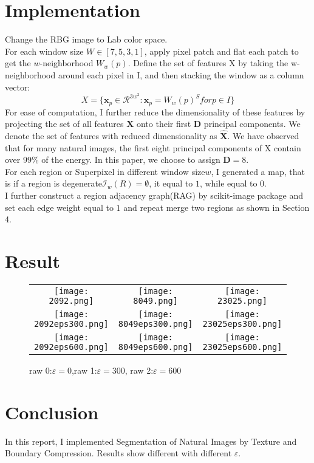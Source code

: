 \documentclass[10pt,twocolumn,letterpaper]{article}
\begin{document}
\section{Implementation}
Change the RBG image to Lab color space. \\
For each window size $W\in[7,5,3,1]$, apply pixel patch and flat each patch to get the $w$-neighborhood $W_w(p)$. Define the set of features X by taking the w- neighborhood around each pixel in I, and then stacking the window as a column vector:
\begin{equation}
X = \{\bm{x}_p\in\mathcal{R}^{3w^2}:\bm{x}_p = W_w(p)^S for p\in I\}
\end{equation}
For ease of computation, I further reduce the dimensionality of these features by projecting the set of all features $\bm{X}$ onto their first $\bm{D}$ principal components. We denote the set of features with reduced dimensionality as $\bm{\hat X}$. We have observed that for many natural images, the first eight principal components of X contain over 99\% of the energy. In this paper, we choose to assign $\bm{D} = 8$. \\
For each region or Superpixel in different window size$w$, I generated a map, that is if a region is degenerate$\mathcal{I}_w(R) = \emptyset$, it equal to $1$, while equal to $0$.\\
I further construct a region adjacency graph(RAG) by scikit-image package and set each edge weight equal to $1$ and repeat merge two regions as shown in Section 4.\\

\section{Result}
\begin{figure}[htb]
\centering
  \begin{tabular}{@{}ccc@{}}
    \texttt{[image: 2092.png]} &
    \texttt{[image: 8049.png]} &
    \texttt{[image: 23025.png]}   \\
    \texttt{[image: 2092eps300.png]} &
    \texttt{[image: 8049eps300.png]} &
    \texttt{[image: 23025eps300.png]}   \\
    \texttt{[image: 2092eps600.png]} &
    \texttt{[image: 8049eps600.png]} &
    \texttt{[image: 23025eps600.png]}   \\
  \end{tabular}
  \caption{raw 0:$\varepsilon =0$,raw 1:$\varepsilon =300$, raw 2:$\varepsilon =600$ }
\end{figure}

\section{Conclusion}
In this report, I implemented Segmentation of Natural Images by Texture and Boundary Compression. Results show different with different $\varepsilon$.


{\small


}
\end{document}
